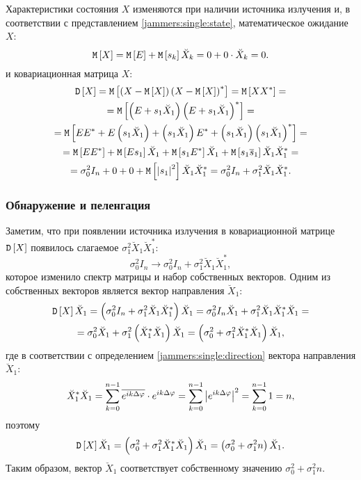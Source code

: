 Характеристики состояния $X$ изменяются при наличии источника излучения и, в соответствии с представлением \eqref{jammers:single:state}, математическое ожидание
$X$:
\[
    \mathtt{M} \left [ X \right ]
    = \mathtt{M} \left [ E \right ] + \mathtt{M} \left [ s_k \right ] \breve{X}_k
    = 0 + 0 \cdot \breve{X}_k
    = 0.
\]
и ковариационная матрица $X$:
\begin{multline*}
    \mathtt{D} \left [ X \right ]
    = \mathtt{M} \left [ \left ( X - \mathtt{M} \left [ X \right ] \right ) \left ( X - \mathtt{M} \left [ X \right ] \right )^* \right ]
    = \mathtt{M} \left [ X X^* \right ] = \\
    = \mathtt{M} \left [ \left ( E + s_1 \breve{X}_1 \right ) \left ( E + s_1 \breve{X}_1 \right )^* \right ] = \\
    = \mathtt{M} \left [ E E^* + E \left ( s_1 \breve{X}_1 \right ) + \left ( s_1 \breve{X}_1 \right ) E^* + \left ( s_1 \breve{X}_1 \right ) \left ( s_1 \breve{X}_1 \right )^* \right ] = \\
    = \mathtt{M} \left [ E E^* \right ] + \mathtt{M} \left [ E s_1 \right ] \breve{X}_1 + \mathtt{M} \left [ s_1 E^* \right ] \breve{X}_1 + \mathtt{M} \left [ s_1 \overline{s}_1 \right ] \breve{X}_1 \breve{X}_1^* = \\
    = \sigma_0^2 I_n + 0 + 0 + \mathtt{M} \left [ \left | s_1 \right |^2 \right ] \breve{X}_1 \breve{X}_1^*
    = \sigma_0^2 I_n + \sigma_1^2 \breve{X}_1 \breve{X}_1^*
    .
\end{multline*}

\subsubsection{Обнаружение и пеленгация}

Заметим, что при появлении источника излучения в ковариационной матрице $\mathtt{D} \left [ X \right ]$ появилось слагаемое $\sigma_1^2 \breve{X}_1 \breve{X}_1^*$:
\[
    \sigma_0^2 I_n \rightarrow \sigma_0^2 I_n + \sigma_1^2 \breve{X}_1 \breve{X}_1^* ,
\]
которое изменило спектр матрицы и набор собственных векторов. Одним из собственных векторов является вектор направления $\breve{X}_1$:
\begin{multline*}
    \mathtt{D} \left [ X \right ] \breve{X}_1
    = \left ( \sigma_0^2 I_n + \sigma_1^2 \breve{X}_1 \breve{X}_1^* \right ) \breve{X}_1
    = \sigma_0^2 I_n \breve{X}_1 + \sigma_1^2 \breve{X}_1 \breve{X}_1^* \breve{X}_1 = \\
    = \sigma_0^2 \breve{X}_1 + \sigma_1^2 \left ( \breve{X}_1^* \breve{X}_1 \right ) \breve{X}_1
    = \left ( \sigma_0^2 + \sigma_1^2 \breve{X}_1^* \breve{X}_1 \right ) \breve{X}_1 ,
\end{multline*}
где в соответствии с определением \eqref{jammers:single:direction} вектора направления $\breve{X}_1$:
\begin{equation}
    \label{jammers:single:direction_self_product}
    \breve{X}_1^* \breve{X}_1
    = \sum_{k=0}^{n-1} \overline{e^{i k \Delta \varphi}} \cdot e^{i k \Delta \varphi}
    = \sum_{k=0}^{n-1} \left | e^{i k \Delta \varphi} \right |^2
    = \sum_{k=0}^{n-1} 1
    = n ,
\end{equation}
поэтому
\[
    \mathtt{D} \left [ X \right ] \breve{X}_1
    = \left ( \sigma_0^2 + \sigma_1^2 \breve{X}_1^* \breve{X}_1 \right ) \breve{X}_1
    = \left ( \sigma_0^2 + \sigma_1^2 n \right ) \breve{X}_1 .
\]
Таким образом, вектор $\breve{X}_1$ соответствует собственному значению $\sigma_0^2 + \sigma_1^2 n$.

